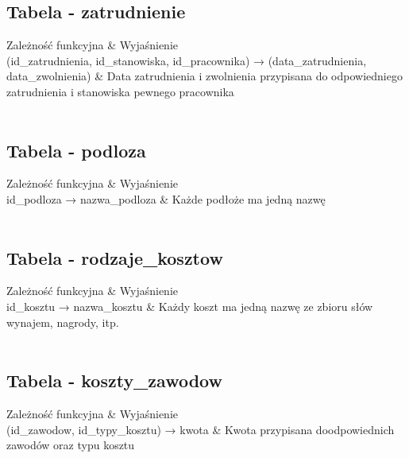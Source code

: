 \documentclass{article}
\begin{document}
\subsection{Tabela - zatrudnienie}

\begin{tcolorbox}[tab2,tabularx={X||X}]
Zależność funkcyjna & Wyjaśnienie     \\
\hline
\hline
(id\_zatrudnienia, id\_stanowiska, id\_pracownika) → (data\_zatrudnienia, data\_zwolnienia) & Data zatrudnienia i zwolnienia przypisana do odpowiedniego zatrudnienia i stanowiska pewnego pracownika \\  \\    
\end{tcolorbox}

\subsection{Tabela - podloza}

\begin{tcolorbox}[tab2,tabularx={X||X}]
Zależność funkcyjna & Wyjaśnienie     \\
\hline
\hline
id\_podloza → nazwa\_podloza & Każde podłoże ma jedną nazwę \\  \\    
\end{tcolorbox}

\subsection{Tabela - rodzaje\_kosztow}

\begin{tcolorbox}[tab2,tabularx={X||X}]
Zależność funkcyjna & Wyjaśnienie     \\
\hline
\hline
id\_kosztu → nazwa\_kosztu & Każdy koszt ma jedną nazwę ze zbioru słów {wynajem, nagrody, itp.} \\  \\    
\end{tcolorbox}

\subsection{Tabela - koszty\_zawodow}

\begin{tcolorbox}[tab2,tabularx={X||X}]
Zależność funkcyjna & Wyjaśnienie     \\
\hline
\hline
(id\_zawodow, id\_typy\_kosztu) → kwota & Kwota przypisana doodpowiednich zawodów oraz typu kosztu \\  \\    
\end{tcolorbox}
\end{document}
